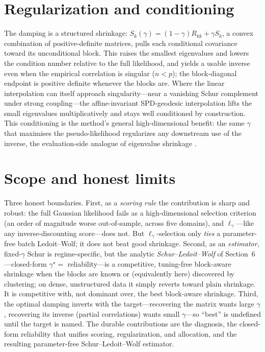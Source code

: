 \documentclass[11pt]{article}
\begin{document}
\section{Regularization and conditioning}
The damping is a structured shrinkage: $S_k(\gamma)=(1-\gamma)R_{kk}+\gamma S_k$, a convex combination
of positive-definite matrices, pulls each conditional covariance toward its unconditional block. This
raises the smallest eigenvalues and lowers the condition number relative to the full likelihood, and
yields a usable inverse even when the empirical correlation is singular ($n<p$); the block-diagonal
endpoint is positive definite whenever the blocks are. Where the linear interpolation can itself
approach singularity---near a vanishing Schur complement under strong coupling---the affine-invariant
SPD-geodesic interpolation lifts the small eigenvalues multiplicatively and stays well conditioned by
construction. This conditioning is the method's general high-dimensional benefit: the same $\gamma$
that maximises the pseudo-likelihood regularizes any downstream use of the inverse, the
evaluation-side analogue of eigenvalue shrinkage \citep{ledoit2004,ledoit2012,bun2017}.

\section{Scope and honest limits}
Three honest boundaries. First, as a \emph{scoring rule} the contribution is sharp and robust: the full
Gaussian likelihood fails as a high-dimensional selection criterion (an order of magnitude worse
out-of-sample, across five domains), and $\ell_\gamma$---like any inverse-discounting score---does not.
But $\ell_\gamma$-selection only \emph{ties} a parameter-free batch Ledoit--Wolf; it does not beat good
shrinkage. Second, as an \emph{estimator}, fixed-$\gamma$ Schur is regime-specific, but the analytic
\emph{Schur--Ledoit--Wolf} of Section~6---closed-form $\gamma^\star=$ reliability---is a competitive,
tuning-free block-aware shrinkage when the blocks are known or (equivalently here) discovered by
clustering; on dense, unstructured data it simply reverts toward plain shrinkage. It is competitive
with, not dominant over, the best block-aware shrinkage. Third, the optimal damping inverts with the
target---recovering the matrix wants large $\gamma$, recovering its inverse (partial correlations) wants
small $\gamma$---so ``best'' is undefined until the target is named. The durable contributions are the
diagnosis, the closed-form reliability that unifies scoring, regularization, and allocation, and the
resulting parameter-free Schur--Ledoit--Wolf estimator.
\end{document}
